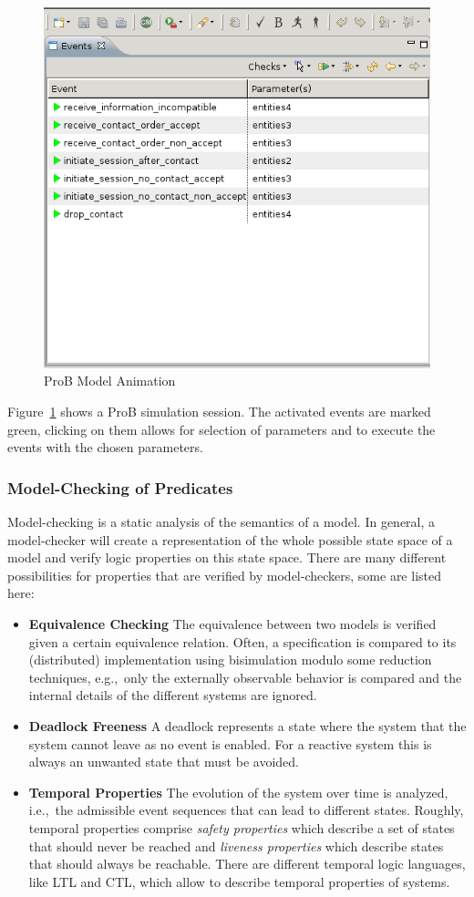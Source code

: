 \begin{figure}[ht]
  \centering
  \includegraphics[width=.5\textwidth]{figures/ProBAnimation}
  \caption{ProB Model Animation}
  \label{fig:proBAnimation}
\end{figure}

Figure~\ref{fig:proBAnimation} shows a ProB simulation session. The activated
events are marked green, clicking on them allows for selection of parameters and
to execute the events with the chosen parameters.


\subsubsection{Model-Checking of Predicates}
\label{sec:model-check-pred}

Model-checking is a static analysis of the semantics of a model. In general, a
model-checker will create a representation of the whole possible state space of
a model and verify logic properties on this state space. There are many
different possibilities for properties that are verified by model-checkers, some
are listed here:

\begin{itemize}
\item {\bf Equivalence Checking} The equivalence between two models is verified
  given a certain equivalence relation. Often, a specification is compared to
  its (distributed) implementation using bisimulation modulo some reduction
  techniques, e.g.,\ only the externally observable behavior is compared and the
  internal details of the different systems are ignored.
\item {\bf Deadlock Freeness} A deadlock represents a state where the system
  that the system cannot leave as no event is enabled. For a reactive system
  this is always an unwanted state that must be avoided.
\item {\bf Temporal Properties} The evolution of the system over time is
  analyzed, i.e.,\ the admissible event sequences that can lead to different
  states. Roughly, temporal properties comprise \emph{safety properties} which
  describe a set of states that should never be reached and \emph{liveness
    properties} which describe states that should always be reachable. There are
  different temporal logic languages, like LTL and CTL, which allow to describe
  temporal properties of systems.
\end{itemize}

